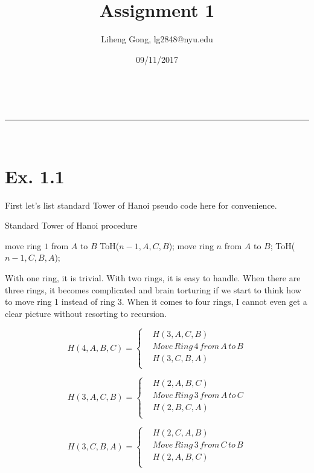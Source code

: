 \documentclass[a4paper,11pt]{article}
\makeatletter
\newcommand{\linia}{\rule{\linewidth}{0.5pt}}
\theoremstyle{mytheor}
\renewcommand{\maketitle}{
\begin{center}
\vspace{2ex}
{\huge \textsc{\@title}}
\vspace{1ex}
\\
\linia\\
\@author \hfill \@date
\vspace{4ex}
\end{center}
}
\makeatother
\begin{document}
\title{Assignment \textnumero{} 1}

\author{Liheng Gong, lg2848@nyu.edu}

\date{09/11/2017}

\maketitle

\section*{Ex. 1.1}
First let's list standard Tower of Hanoi pseudo code here for convenience.
\begin{algorithm}[H]
\caption{Standard Tower of Hanoi procedure}\label{TOH1_1}
\begin{algorithmic}[1]
    \State move ring $1$ from $A$ to $B$
  \Else
    \State ToH($n-1, A, C, B$);
    \State move ring $n$ from $A$ to $B$;
    \State ToH($n-1, C, B, A$);
  \EndIf
\EndProcedure
\end{algorithmic}
\end{algorithm}


With one ring, it is trivial. With two rings, it is easy to handle. When there are three rings, it becomes complicated and brain torturing if we start to think how to move ring 1 instead of ring 3. When it comes to four rings, I cannot even get a clear picture without resorting to recursion.

$$H(4,A,B,C)=\left\{
\begin{aligned}
&H(3,A,C,B) \\
&Move\, Ring\, 4\, from\, A\, to\, B\\
&H(3,C,B,A) \\
\end{aligned}
\right.
$$

$$H(3,A,C,B)=\left\{
\begin{aligned}
&H(2,A,B,C) \\
&Move\, Ring\, 3\, from\, A\, to\, C\\
&H(2,B,C,A) \\
\end{aligned}
\right.
$$

$$H(3,C,B,A)=\left\{
\begin{aligned}
&H(2,C,A,B) \\
&Move\, Ring\, 3\, from\, C\, to\, B\\
&H(2,A,B,C) \\
\end{aligned}
\right.
$$
\end{document}
